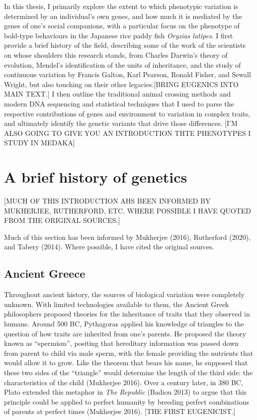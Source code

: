 \documentclass[
]{book}
\begin{document}
In this thesis, I primarily explore the extent to which phenotypic variation is determined by an individual's own genes, and how much it is mediated by the genes of one's social companions, with a particular focus on the phenotype of bold-type behaviours in the Japanese rice paddy fish \emph{Oryzias latipes}. I first provide a brief history of the field, describing some of the work of the scientists on whose shoulders this research stands, from Charles Darwin's theory of evolution, Mendel's identification of the units of inheritance, and the study of continuous variation by Francis Galton, Karl Pearson, Ronald Fisher, and Sewall Wright, but also touching on their other legacies.{[}BRING EUGENICS INTO MAIN TEXT.{]} I then outline the traditional animal crossing methods and modern DNA sequencing and statistical techniques that I used to parse the respective contributions of genes and environment to variation in complex traits, and ultimately identify the genetic variants that drive those differences. {[}I'M ALSO GOING TO GIVE YOU AN INTRODUCTION THTE PHENOTYPES I STUDY IN MEDAKA{]}

\hypertarget{a-brief-history-of-genetics}{%
\section{A brief history of genetics}\label{a-brief-history-of-genetics}}

{[}MUCH OF THIS INTRODUCTION AHS BEEN INFORMED BY MUKHERJEE, RUTHERFORD, ETC. WHERE POSSIBLE I HAVE QUOTED FROM THE ORIGINAL SOURCES.{]}

Much of this section has been informed by Mukherjee (2016), Rutherford (2020), and Tabery (2014). Where possible, I have cited the original sources.

\hypertarget{ancient-greece}{%
\subsection{Ancient Greece}\label{ancient-greece}}

Throughout ancient history, the sources of biological variation were completely unknown. With limited technologies available to them, the Ancient Greek philosophers proposed theories for the inheritance of traits that they observed in humans. Around 500 BC, Pythagoras applied his knowledge of triangles to the question of how traits are inherited from one's parents. He proposed the theory known as ``spermism'', positing that hereditary information was passed down from parent to child via male sperm, with the female providing the nutrients that would allow it to grow. Like the theorem that bears his name, he supposed that these two sides of the ``triangle'' would determine the length of the third side: the characteristics of the child (Mukherjee 2016). Over a century later, in 380 BC, Plato extended this metaphor in \emph{The Republic} (Badiou 2013) to argue that this principle could be applied to perfect humanity by breeding perfect combinations of parents at perfect times (Mukherjee 2016). {[}THE FIRST EUGENICIST.{]}
\end{document}
